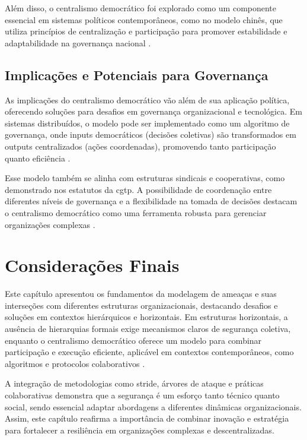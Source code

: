 Além disso, o centralismo democrático foi explorado como um componente
essencial em sistemas políticos contemporâneos, como no modelo chinês, que
utiliza princípios de centralização e participação para promover
estabilidade e adaptabilidade na governança nacional
\cite{StillaCenturyoftheChineseModel}.

\subsection{Implicações e Potenciais para Governança}
\label{sec:implicacoes_potenciais}

As implicações do centralismo democrático vão além de sua aplicação
política, oferecendo soluções para desafios em governança organizacional e
tecnológica. Em sistemas distribuídos, o modelo pode ser implementado como
um algoritmo de governança, onde inputs democráticos (decisões coletivas)
são transformados em outputs centralizados (ações coordenadas), promovendo
tanto participação quanto eficiência \cite{DoArtifactsHavePolitics}.

Esse modelo também se alinha com estruturas sindicais e cooperativas, como
demonstrado nos estatutos da \gls{cgtp}. A possibilidade de coordenação entre
diferentes níveis de governança e a flexibilidade na tomada de decisões
destacam o centralismo democrático como uma ferramenta robusta para
gerenciar organizações complexas \cite{CGTPStatutes}.


\section*{Considerações Finais}

Este capítulo apresentou os fundamentos da modelagem de ameaças e suas
interseções com diferentes estruturas organizacionais, destacando desafios
e soluções em contextos hierárquicos e horizontais. Em estruturas
horizontais, a ausência de hierarquias formais exige mecanismos claros de
segurança coletiva, enquanto o centralismo democrático oferece um modelo
para combinar participação e execução eficiente, aplicável em contextos
contemporâneos, como algoritmos e protocolos colaborativos \cite{Colbac,
EstatutosDoPCP}.

A integração de metodologias como \gls{stride}, árvores de ataque e
práticas colaborativas demonstra que a segurança é um esforço tanto técnico
quanto social, sendo essencial adaptar abordagens a diferentes dinâmicas
organizacionais. Assim, este capítulo reafirma a importância de combinar
inovação e estratégia para fortalecer a resiliência em organizações
complexas e descentralizadas.